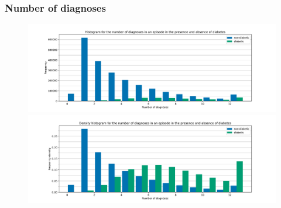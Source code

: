 \documentclass{beamer}
\begin{document}
\begin{frame}
    \frametitle{Number of diagnoses}
   
    \begin{figure}
        \begin{minipage}{\linewidth}
            \includegraphics[width=\linewidth]
                {./img/diabetic_diag_no_freq_hist.pdf}
        \end{minipage}
        \begin{minipage}{\linewidth}
            \includegraphics[width=\linewidth]
                {./img/diabetic_diag_no_density_hist.pdf}
        \end{minipage}
    \end{figure}
\end{frame}
\end{document}
